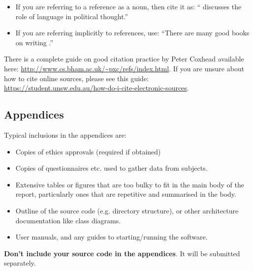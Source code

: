 \documentclass{l4proj}
\begin{document}
\begin{itemize}
\item If you are referring to a reference as a noun, then cite it as: ``\citet{Orw68} discusses the role of language in political thought.''
\item If you are referring implicitly to references, use: ``There are many good books on writing \citep{Orw68, Wil09, Pin15}.''
\end{itemize}

There is a complete guide on good citation practice by Peter Coxhead available here: \url{http://www.cs.bham.ac.uk/~pxc/refs/index.html}. 
If you are unsure about how to cite online sources, please see this guide: \url{https://student.unsw.edu.au/how-do-i-cite-electronic-sources}.

%
% 

\begin{appendices}

\chapter{Appendices}

Typical inclusions in the appendices are:

\begin{itemize}
\item
 Copies of ethics approvals (required if obtained)
\item
 Copies of questionnaires etc. used to gather data from subjects.
\item
 Extensive tables or figures that are too bulky to fit in the main body of
 the report, particularly ones that are repetitive and summarised in the body.

\item Outline of the source code (e.g. directory structure), or other architecture documentation like class diagrams.

\item User manuals, and any guides to starting/running the software.

\end{itemize}

\textbf{Don't include your source code in the appendices}. It will be
submitted separately.

\end{appendices}
\end{document}
